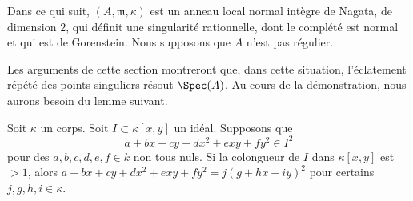 \begin{situation} \label{situation-rational-double-point} Dans ce qui suit, $(A, \mathfrak m, \kappa)$ est un anneau local normal intègre de Nagata, de dimension $2$, qui définit une singularité rationnelle, dont le complété est normal et qui est de Gorenstein. Nous supposons que $A$ n'est pas régulier. \end{situation}

\noindent Les arguments de cette section montreront que, dans cette situation, l'éclatement répété des points singuliers résout $\Spec(A)$. Au cours de la démonstration, nous aurons besoin du lemme suivant.

\begin{lemma} \label{lemma-issquare} Soit $\kappa$ un corps. Soit $I \subset \kappa[x, y]$ un idéal. Supposons que $$
a + b x + c y + d x^2 + exy + f y^2 \in I^2
$$ pour des $a, b, c, d, e, f \in k$ non tous nuls. Si la colongueur de $I$ dans $\kappa[x, y]$ est $> 1$, alors $a + b x + c y + d x^2 + exy + f y^2 = j(g + hx + iy)^2$ pour certains $j, g, h, i \in \kappa$. \end{lemma}

